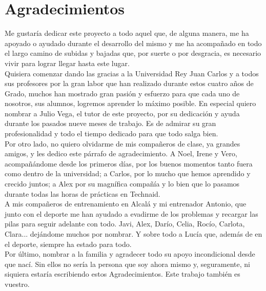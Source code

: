 \cleardoublepage

\chapter*{Agradecimientos}

Me gustaría dedicar este proyecto a todo aquel que, de alguna manera, me ha apoyado o ayudado durante el desarrollo del mismo y me ha acompañado en todo el largo camino de subidas y bajadas que, por suerte o por desgracia, es necesario vivir para lograr llegar hasta este lugar.\\

Quisiera comenzar dando las gracias a la Universidad Rey Juan Carlos y a todos sus profesores por la gran labor que han realizado durante estos cuatro años de Grado, muchos han mostrado gran pasión y esfuerzo para que cada uno de nosotros, sus alumnos, logremos aprender lo máximo posible. En especial quiero nombrar a Julio Vega, el tutor de este proyecto, por su dedicación y ayuda durante los pasados nueve meses de trabajo. Es de admirar su gran profesionalidad y todo el tiempo dedicado para que todo salga bien.\\

Por otro lado, no quiero olvidarme de mis compañeros de clase, ya grandes amigos, y les dedico este párrafo de agradecimiento. A Noel, Irene y Vero, acompañándome desde los primeros días, por los buenos momentos tanto fuera como dentro de la universidad; a Carlos, por lo mucho que hemos aprendido y crecido juntos; a Alex por su magnífica compañía y lo bien que lo pasamos durante todas las horas de prácticas en Technaid.\\

A mis compañeros de entrenamiento en Alcalá y mi entrenador Antonio, que junto con el deporte me han ayudado a evadirme de los problemas y recargar las pilas para seguir adelante con todo. Javi, Alex, Darío, Celia, Rocío, Carlota, Clara... dejándome muchos por nombrar. Y sobre todo a Lucía que, además de en el deporte, siempre ha estado para todo.\\

Por último, nombrar a la familia y agradecer todo su apoyo incondicional desde que nací. Sin ellos no sería la persona que soy ahora mismo y, seguramente, ni siquiera estaría escribiendo estos Agradecimientos. Este trabajo también es vuestro.

\thispagestyle{empty}

